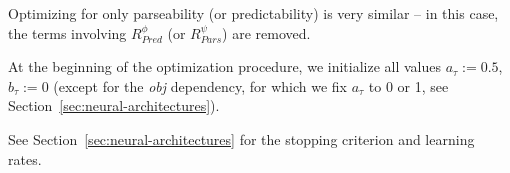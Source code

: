 \documentclass[10pt,twoside,lineno]{article}
\DeclareMathOperator{\E}{\mathop{\mathbb{E}}}
\begin{document}
Optimizing for only parseability (or predictability) is very similar -- in this case, the terms involving $R_{Pred}^\phi$ (or $R_{Pars}^\psi$) are removed.


At the beginning of the optimization procedure, we initialize all values $a_\tau := 0.5$, $b_\tau := 0$ (except for the \emph{obj} dependency, for which we fix $a_\tau$ to 0 or 1, see Section~\ref{sec:neural-architectures}).

See Section~\ref{sec:neural-architectures} for the stopping criterion and learning rates.



%
%
\end{document}
